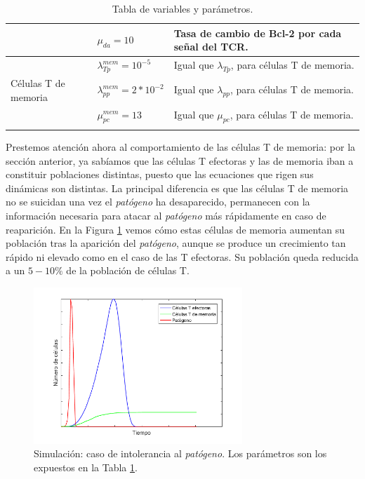 \begin{table}[h]
\begin{center}
\begin{tabular}{>{\centering\arraybackslash}m{2cm} >{\arraybackslash}m{3cm} >{\arraybackslash}m{7cm} }
			& $\mu_{da} = 10$                 & Tasa de cambio de Bcl-2 por cada señal del TCR.           \\ \hline
			\multirow{4}{*}{} & $\lambda_{Tp}^{mem} = 10^{-5}$   & Igual que $\lambda_{Tp}$, para células T de memoria.      \\ \cline{2-3}
			Células T de memoria        & $\lambda_{pp}^{mem} = 2*10^{-2}$ & Igual que $\lambda_{pp}$, para células T de memoria.      \\ \cline{2-3}
			& $\mu_{pc}^{mem} = 13$           & Igual que $\mu_{pc}$, para células T de memoria.          \\ \cline{2-3}\hline
		\end{tabular}
		\caption{Tabla de variables y parámetros.}
		\label{tabla:param}
	\end{center}
\end{table}


Prestemos atención ahora al comportamiento de las células T de memoria: por la sección anterior, ya sabíamos que las células T efectoras y las de memoria iban a constituir poblaciones distintas, puesto que las ecuaciones que rigen sus dinámicas son distintas. La principal diferencia es que las células T de memoria no se suicidan una vez el \textit{patógeno} ha desaparecido, permanecen con la información necesaria para atacar al \textit{patógeno} más rápidamente en caso de reaparición. En la Figura \ref{fig:intolerance} vemos cómo estas células de memoria aumentan su población tras la aparición del \textit{patógeno}, aunque se produce un crecimiento tan rápido ni elevado como en el caso de las T efectoras. Su población queda reducida a un $5-10\%$ de la población de células T.


\begin{figure}[t]
	\centering
	\includegraphics[width=0.7\textwidth]{Imagenes/Simulaciones/intolerance}
	\caption{Simulación: caso de intolerancia al \textit{patógeno}. Los parámetros son los expuestos en la Tabla \ref{tabla:param}.}
	\label{fig:intolerance}
\end{figure}

